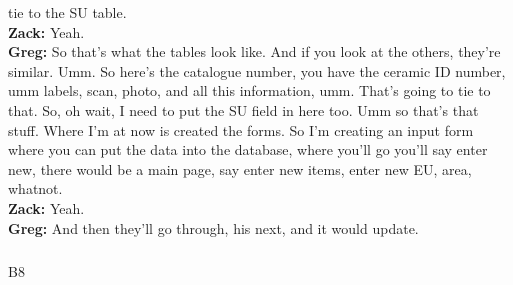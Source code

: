 \documentclass[
  canadian,
]{article}
\makeatletter
\let\oldsubparagraph\subparagraph
\renewcommand{\subparagraph}{
    \@ifstar
      \xxxSubParagraphStar
      \xxxSubParagraphNoStar
  }
\newcommand{\xxxSubParagraphStar}[1]{\oldsubparagraph*{#1}\mbox{}}
\newcommand{\xxxSubParagraphNoStar}[1]{\oldsubparagraph{#1}\mbox{}}
\makeatother
\begin{document}
tie to the SU table.\\
\textbf{Zack:} Yeah.\\
\textbf{Greg:} So that's what the tables look like. And if you look at
the others, they're similar. Umm. So here's the catalogue number, you
have the ceramic ID number, umm labels, scan, photo, and all this
information, umm. That's going to tie to that. So, oh wait, I need to
put the SU field in here too. Umm so that's that stuff. Where I'm at now
is created the forms. So I'm creating an input form where you can put
the data into the database, where you'll go you'll say enter new, there
would be a main page, say enter new items, enter new EU, area,
whatnot.\\
\textbf{Zack:} Yeah.\\
\textbf{Greg:} And then they'll go through, his next, and it would
update.

\subparagraph{B8}\label{sec-B8}
\end{document}
